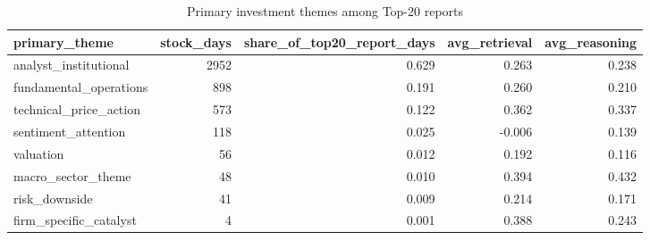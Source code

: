 \begin{table}[!htbp]\centering
\caption{Primary investment themes among Top-20 reports}
\label{tab:deep_theme_prevalence}
\begin{tabular}{lrrrr}
\toprule
primary\_theme & stock\_days & share\_of\_top20\_report\_days & avg\_retrieval & avg\_reasoning \\
\midrule
analyst\_institutional & 2952 & 0.629 & 0.263 & 0.238 \\
fundamental\_operations & 898 & 0.191 & 0.260 & 0.210 \\
technical\_price\_action & 573 & 0.122 & 0.362 & 0.337 \\
sentiment\_attention & 118 & 0.025 & -0.006 & 0.139 \\
valuation & 56 & 0.012 & 0.192 & 0.116 \\
macro\_sector\_theme & 48 & 0.010 & 0.394 & 0.432 \\
risk\_downside & 41 & 0.009 & 0.214 & 0.171 \\
firm\_specific\_catalyst & 4 & 0.001 & 0.388 & 0.243 \\
\bottomrule
\end{tabular}
\end{table}
